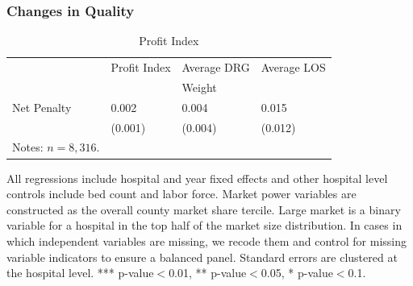 \documentclass[ucs,9pt]{beamer}
\begin{document}
\begin{frame}
\frametitle{Changes in Quality}
\begin{table}[htp]
\centering \normalsize
\caption{Profit Index}
\label{tab:samplemort}
\footnotesize
\begin{tabular}{llll}
\hline\hline
 & Profit Index & Average DRG & Average LOS \\
 & 			& Weight & \\
\hline							
Net Penalty  		&	0.002	&	0.004	&	0.015	\\
	&	(0.001)	&	(0.004)	&	(0.012)	\\
\hline
\tiny Notes: $n=8,316$.  
\end{tabular}
\end{table}
\tiny All regressions include hospital and year fixed effects and other hospital level controls include bed count and labor force.  Market power variables are constructed as the overall county market share tercile.  Large market is a binary variable for a hospital in the top half of the market size distribution.  In cases in which independent variables are missing, we recode them and control for missing variable indicators to ensure a balanced panel.  Standard errors are clustered at the hospital level.  *** p-value$<$0.01, ** p-value$<$0.05, * p-value$<$0.1.
\end{frame}
\end{document}
